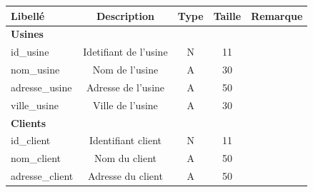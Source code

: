 \documentclass[french]{article}
\begin{document}
\begin{table}[!htbp]
\begin{tabular}{|lcccl|}
\hline
\multicolumn{1}{|l|}{\textbf{Libellé}}     & \multicolumn{1}{c|}{\textbf{Description}}        & \multicolumn{1}{c|}{\textbf{Type}} & \multicolumn{1}{c|}{\textbf{Taille}} & \multicolumn{1}{c|}{\textbf{Remarque}}          \\ \hline
	
\multicolumn{5}{|l|}{\textbf{Usines}}                                                                                                                                                               \\ \hline
\multicolumn{1}{|l|}{id\_usine}            & \multicolumn{1}{c|}{Idetifiant de l'usine}       & \multicolumn{1}{c|}{N}             & \multicolumn{1}{c|}{11}              &                                                 \\ \hline
\multicolumn{1}{|l|}{nom\_usine}           & \multicolumn{1}{c|}{Nom de l'usine}              & \multicolumn{1}{c|}{A}             & \multicolumn{1}{c|}{30}              &                                                 \\ \hline
\multicolumn{1}{|l|}{adresse\_usine}       & \multicolumn{1}{c|}{Adresse de l'usine}          & \multicolumn{1}{c|}{A}             & \multicolumn{1}{c|}{50}              &                                                 \\ \hline
\multicolumn{1}{|l|}{ville\_usine}         & \multicolumn{1}{c|}{Ville de l'usine}            & \multicolumn{1}{c|}{A}             & \multicolumn{1}{c|}{30}              &                                                 \\ \hline
\multicolumn{5}{|l|}{\textbf{Clients}}                                                                                                                                                              \\ \hline
\multicolumn{1}{|l|}{id\_client}           & \multicolumn{1}{c|}{Identifiant client}          & \multicolumn{1}{c|}{N}             & \multicolumn{1}{c|}{11}              &                                                 \\ \hline
\multicolumn{1}{|l|}{nom\_client}          & \multicolumn{1}{c|}{Nom du client}               & \multicolumn{1}{c|}{A}             & \multicolumn{1}{c|}{50}              &                                                 \\ \hline
\multicolumn{1}{|l|}{adresse\_client}      & \multicolumn{1}{c|}{Adresse du client}           & \multicolumn{1}{c|}{A}             & \multicolumn{1}{c|}{50}              &                                                 \\ \hline

\end{tabular}
\end{table}
\end{document}
